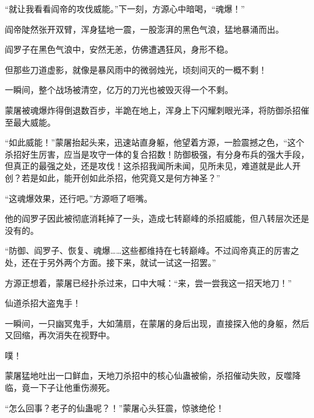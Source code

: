 \begin{this_body}
“就让我看看阎帝的攻伐威能。”下一刻，方源心中暗喝，“魂爆！”

阎帝陡然张开双臂，浑身猛地一震，一股澎湃的黑色气浪，猛地暴涌而出。

阎罗子在黑色气浪中，安然无恙，仿佛遭遇狂风，身形不稳。

但那些刀道虚影，就像是暴风雨中的微弱烛光，顷刻间灭的一概不剩！

一瞬间，整个战场被清空，亿万的刀光也被毁灭得一个不剩。

蒙屠被魂爆炸得倒退数百步，半跪在地上，浑身上下闪耀刺眼光泽，将防御杀招催至最大威能。

“如此威能！”蒙屠抬起头来，迅速站直身躯，他望着方源，一脸震撼之色，“这个杀招好生厉害，应当是攻守一体的复合招数！防御极强，有分身布兵的强大手段，但真正的最强之处，还是攻伐！这杀招我闻所未闻，见所未见，难道就是此人开创？若是如此，能开创如此杀招，他究竟又是何方神圣？”

“这魂爆效果，还行吧。”方源咂了咂嘴。

他的阎罗子因此被彻底消耗掉了一头，造成七转巅峰的杀招威能，但八转层次还是没有的。

“防御、阎罗子、恢复、魂爆……这些都维持在七转巅峰。不过阎帝真正的厉害之处，还在于另外两个方面。接下来，就试一试这一招罢。”

方源正想着，蒙屠已经扑杀过来，口中大喊：“来，尝一尝我这一招天地刀！”

仙道杀招大盗鬼手！

一瞬间，一只幽冥鬼手，大如蒲扇，在蒙屠的身后出现，直接探入他的身躯，然后又回缩，再次消失在视野中。

噗！

蒙屠猛地吐出一口鲜血，天地刀杀招中的核心仙蛊被偷，杀招催动失败，反噬降临，竟一下子让他重伤濒死。

“怎么回事？老子的仙蛊呢？！”蒙屠心头狂震，惊骇绝伦！

\end{this_body}

